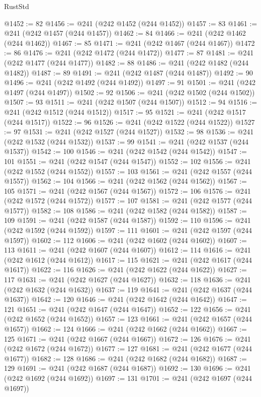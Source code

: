 \begin{lexlean}{RustStd}
\begin{coremodule}
@1452 := 82
@1456 := @241 (@242 @1452 (@244 @1452))
@1457 := 83
@1461 := @241 (@242 @1457 (@244 @1457))
@1462 := 84
@1466 := @241 (@242 @1462 (@244 @1462))
@1467 := 85
@1471 := @241 (@242 @1467 (@244 @1467))
@1472 := 86
@1476 := @241 (@242 @1472 (@244 @1472))
@1477 := 87
@1481 := @241 (@242 @1477 (@244 @1477))
@1482 := 88
@1486 := @241 (@242 @1482 (@244 @1482))
@1487 := 89
@1491 := @241 (@242 @1487 (@244 @1487))
@1492 := 90
@1496 := @241 (@242 @1492 (@244 @1492))
@1497 := 91
@1501 := @241 (@242 @1497 (@244 @1497))
@1502 := 92
@1506 := @241 (@242 @1502 (@244 @1502))
@1507 := 93
@1511 := @241 (@242 @1507 (@244 @1507))
@1512 := 94
@1516 := @241 (@242 @1512 (@244 @1512))
@1517 := 95
@1521 := @241 (@242 @1517 (@244 @1517))
@1522 := 96
@1526 := @241 (@242 @1522 (@244 @1522))
@1527 := 97
@1531 := @241 (@242 @1527 (@244 @1527))
@1532 := 98
@1536 := @241 (@242 @1532 (@244 @1532))
@1537 := 99
@1541 := @241 (@242 @1537 (@244 @1537))
@1542 := 100
@1546 := @241 (@242 @1542 (@244 @1542))
@1547 := 101
@1551 := @241 (@242 @1547 (@244 @1547))
@1552 := 102
@1556 := @241 (@242 @1552 (@244 @1552))
@1557 := 103
@1561 := @241 (@242 @1557 (@244 @1557))
@1562 := 104
@1566 := @241 (@242 @1562 (@244 @1562))
@1567 := 105
@1571 := @241 (@242 @1567 (@244 @1567))
@1572 := 106
@1576 := @241 (@242 @1572 (@244 @1572))
@1577 := 107
@1581 := @241 (@242 @1577 (@244 @1577))
@1582 := 108
@1586 := @241 (@242 @1582 (@244 @1582))
@1587 := 109
@1591 := @241 (@242 @1587 (@244 @1587))
@1592 := 110
@1596 := @241 (@242 @1592 (@244 @1592))
@1597 := 111
@1601 := @241 (@242 @1597 (@244 @1597))
@1602 := 112
@1606 := @241 (@242 @1602 (@244 @1602))
@1607 := 113
@1611 := @241 (@242 @1607 (@244 @1607))
@1612 := 114
@1616 := @241 (@242 @1612 (@244 @1612))
@1617 := 115
@1621 := @241 (@242 @1617 (@244 @1617))
@1622 := 116
@1626 := @241 (@242 @1622 (@244 @1622))
@1627 := 117
@1631 := @241 (@242 @1627 (@244 @1627))
@1632 := 118
@1636 := @241 (@242 @1632 (@244 @1632))
@1637 := 119
@1641 := @241 (@242 @1637 (@244 @1637))
@1642 := 120
@1646 := @241 (@242 @1642 (@244 @1642))
@1647 := 121
@1651 := @241 (@242 @1647 (@244 @1647))
@1652 := 122
@1656 := @241 (@242 @1652 (@244 @1652))
@1657 := 123
@1661 := @241 (@242 @1657 (@244 @1657))
@1662 := 124
@1666 := @241 (@242 @1662 (@244 @1662))
@1667 := 125
@1671 := @241 (@242 @1667 (@244 @1667))
@1672 := 126
@1676 := @241 (@242 @1672 (@244 @1672))
@1677 := 127
@1681 := @241 (@242 @1677 (@244 @1677))
@1682 := 128
@1686 := @241 (@242 @1682 (@244 @1682))
@1687 := 129
@1691 := @241 (@242 @1687 (@244 @1687))
@1692 := 130
@1696 := @241 (@242 @1692 (@244 @1692))
@1697 := 131
@1701 := @241 (@242 @1697 (@244 @1697))

\end{coremodule}
\end{lexlean}
